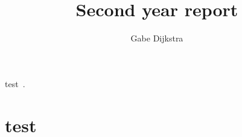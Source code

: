 \documentclass[a4paper,10pt]{article}
\title{Second year report}
\author{Gabe Dijkstra}
\begin{document}
\maketitle

test~\cite{UFP2013}.

\section{test}


\end{document}
